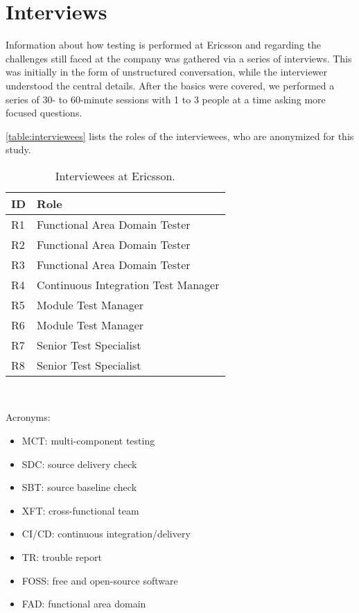 \section{Interviews}
\label{sec:ind_interviews}


Information about how testing is performed at Ericsson and regarding the challenges still faced at the company was gathered via a series of interviews.
This was initially in the form of unstructured conversation, while the interviewer understood the central details.
After the basics were covered, we performed a series of 30- to 60-minute sessions with 1 to 3 people at a time asking more focused questions.

\autoref{table:interviewees} lists the roles of the interviewees, who are anonymized for this study.

\begin{table}[]
\centering
{}
\begin{tabular}{ll}
\toprule
\textbf{ID} & \textbf{Role} \\
\midrule
R1 & Functional Area Domain Tester \\
R2 & Functional Area Domain Tester \\
R3 & Functional Area Domain Tester \\
R4 & Continuous Integration Test Manager \\
R5 & Module Test Manager \\
R6 & Module Test Manager \\
R7 & Senior Test Specialist \\
R8 & Senior Test Specialist \\
\bottomrule
\end{tabular}\\
\caption{Interviewees at Ericsson.}
\label{table:interviewees}
\end{table}

Acronyms:
\begin{itemize}
	\item MCT: multi-component testing
	\item SDC: source delivery check
	\item SBT: source baseline check
	\item XFT: cross-functional team
	\item CI/CD: continuous integration/delivery
	\item TR: trouble report
	\item FOSS: free and open-source software
	\item FAD: functional area domain
\end{itemize}

